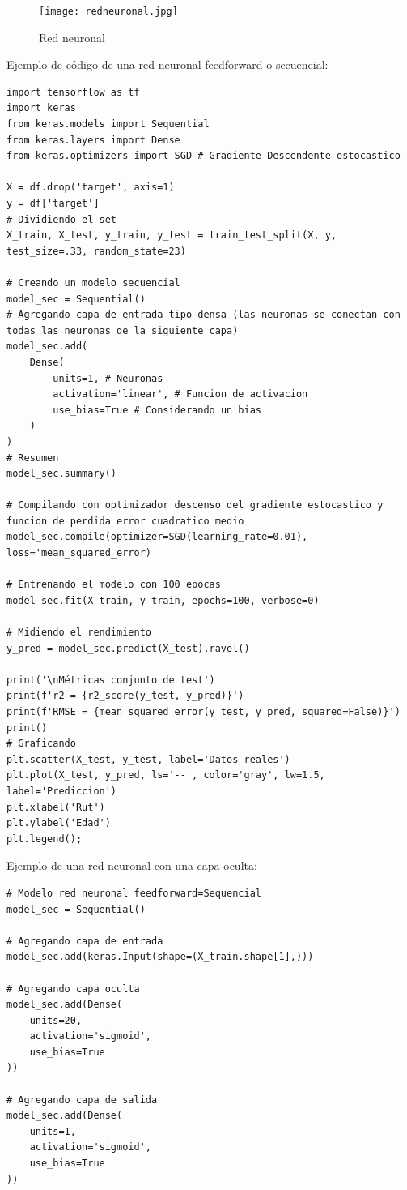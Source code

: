 \documentclass[a4paper, 12pt]{book}
\begin{document}
\begin{figure}[H] 
	\centering 
	\texttt{[image: redneuronal.jpg]}
	\caption{Red neuronal}
\end{figure}

Ejemplo de código de una red neuronal feedforward o secuencial:
\begin{verbatim}
import tensorflow as tf
import keras
from keras.models import Sequential
from keras.layers import Dense
from keras.optimizers import SGD # Gradiente Descendente estocastico

X = df.drop('target', axis=1)
y = df['target']
# Dividiendo el set
X_train, X_test, y_train, y_test = train_test_split(X, y, test_size=.33, random_state=23)

# Creando un modelo secuencial
model_sec = Sequential()
# Agregando capa de entrada tipo densa (las neuronas se conectan con todas las neuronas de la siguiente capa)
model_sec.add(
	Dense(
		units=1, # Neuronas
		activation='linear', # Funcion de activacion
		use_bias=True # Considerando un bias
	)
)
# Resumen
model_sec.summary()

# Compilando con optimizador descenso del gradiente estocastico y funcion de perdida error cuadratico medio 
model_sec.compile(optimizer=SGD(learning_rate=0.01), loss='mean_squared_error)

# Entrenando el modelo con 100 epocas
model_sec.fit(X_train, y_train, epochs=100, verbose=0)

# Midiendo el rendimiento
y_pred = model_sec.predict(X_test).ravel()

print('\nMétricas conjunto de test')
print(f'r2 = {r2_score(y_test, y_pred)}')
print(f'RMSE = {mean_squared_error(y_test, y_pred, squared=False)}')
print()
# Graficando
plt.scatter(X_test, y_test, label='Datos reales')
plt.plot(X_test, y_pred, ls='--', color='gray', lw=1.5, label='Prediccion')
plt.xlabel('Rut')
plt.ylabel('Edad')
plt.legend();
\end{verbatim}

Ejemplo de una red neuronal con una capa oculta:
\begin{verbatim}
# Modelo red neuronal feedforward=Sequencial
model_sec = Sequential()

# Agregando capa de entrada
model_sec.add(keras.Input(shape=(X_train.shape[1],)))

# Agregando capa oculta
model_sec.add(Dense(
	units=20,
	activation='sigmoid',
	use_bias=True
))

# Agregando capa de salida
model_sec.add(Dense(
	units=1,
	activation='sigmoid',
	use_bias=True
))
\end{verbatim}
\end{document}

